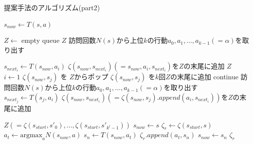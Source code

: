 \begin{algorithm}
    \label{alg:myalg-2}
    \caption{提案手法のアルゴリズム(part2)}
    \begin{algorithmic}[1]    
    \scriptsize   
           \State $s_{now} \gets T(s, a)$
           
           \State $Z \gets $ empty queue
             \Return  $Z$
            \EndIf
           \State 訪問回数$N(s)$から上位$k$の行動${a_0, a_1, ..., a_{k-1}}(=\alpha)$を取り出す
             
             \State $s_{{next}_i} \gets T(s_{now}, a_i)$
             \State $\zeta(s_{now},s_{{next}_i})(={s_{now}, a_i, s_{{next}_i}})$を$Z$の末尾に追加
           \EndFor
             \Return $Z$
           \EndIf
           \State $i \gets 1$
                    \State $\zeta(s_{now}, s_{j})$ を $Z$からポップ
                        \State $\zeta(s_{now}, s_{j})$ を$k$回$Z$の末尾に追加
                        \State continue
                    \EndIf
                    \State 訪問回数$N(s)$から上位$k$の行動${a_0, a_1, ..., a_{k-1}}(=\alpha)$を取り出す
                        \State $s_{{next}_j} \gets T(s_{j}, a_i)$
                        \State $\zeta(s_{now},s_{{next}_i})(=\zeta(s_{now}, s_{j}).append({a_i, s_{{next}_i}}))$を$Z$の末尾に追加
                    \EndFor
                    
                \EndFor     
           \EndWhile
           \Return $Z(={\zeta(s_{start}, {s'}_0), ..., \zeta(s_{start}, {s'}_{k^l-1})})$
        \EndFunction
        \State $s_{now} \gets s$
        \State $\zeta_r \gets \zeta(s_{start}, s)$
            \State $a_t \gets \textrm{argmax}_a N(s_{now}, a)$
            \State $s_n \gets T(s_{now}, a_t)$
            \State $\zeta_r.append({a_t, s_n})$
            \State $s_{now} \gets s_n$
        \EndWhile
        \Return $\zeta_r$
        \EndFunction
       
        
    \end{algorithmic}
\end{algorithm}




